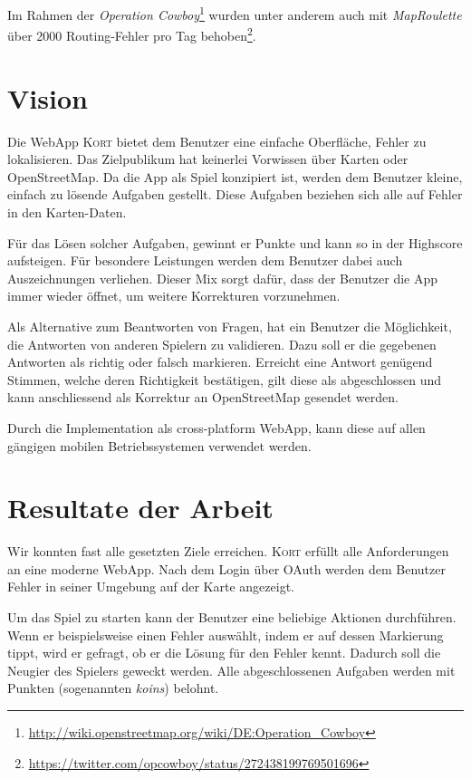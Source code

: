 Im Rahmen der \emph{Operation Cowboy}\footnote{\url{http://wiki.openstreetmap.org/wiki/DE:Operation_Cowboy}} wurden unter anderem auch mit \emph{MapRoulette} über 2000 Routing-Fehler pro Tag behoben\footnote{\url{https://twitter.com/opcowboy/status/272438199769501696}}.

\section{Vision}
Die \gls{WebApp} \textsc{Kort} bietet dem Benutzer eine einfache Oberfläche, Fehler zu lokalisieren.
Das Zielpublikum hat keinerlei Vorwissen über Karten oder \gls{OpenStreetMap}.
Da die App als Spiel konzipiert ist, werden dem Benutzer kleine, einfach zu lösende Aufgaben gestellt.
Diese Aufgaben beziehen sich alle auf Fehler in den Karten-Daten.

Für das Lösen solcher Aufgaben, gewinnt er Punkte und kann so in der Highscore aufsteigen.
Für besondere Leistungen werden dem Benutzer dabei auch Auszeichnungen verliehen.
Dieser Mix sorgt dafür, dass der Benutzer die App immer wieder öffnet, um weitere Korrekturen vorzunehmen.

Als Alternative zum Beantworten von Fragen, hat ein Benutzer die Möglichkeit, die Antworten von anderen Spielern zu validieren.
Dazu soll er die gegebenen Antworten als richtig oder falsch markieren.
Erreicht eine Antwort genügend Stimmen, welche deren Richtigkeit bestätigen, gilt diese als abgeschlossen und kann anschliessend als Korrektur an \gls{OpenStreetMap} gesendet werden.

Durch die Implementation als cross-platform \gls{WebApp}, kann diese auf allen gängigen mobilen Betriebssystemen verwendet werden.

\section{Resultate der Arbeit}
Wir konnten fast alle gesetzten Ziele erreichen.
\textsc{Kort} erfüllt alle Anforderungen an eine moderne \gls{WebApp}.
Nach dem Login über \gls{OAuth} werden dem Benutzer Fehler in seiner Umgebung auf der Karte angezeigt.

Um das Spiel zu starten kann der Benutzer eine beliebige Aktionen durchführen.
Wenn er beispielsweise einen Fehler auswählt, indem er auf dessen Markierung tippt, wird er gefragt, ob er die Lösung für den Fehler kennt.
Dadurch soll die Neugier des Spielers geweckt werden.
Alle abgeschlossenen Aufgaben werden mit Punkten (sogenannten \emph{koins}) belohnt.

